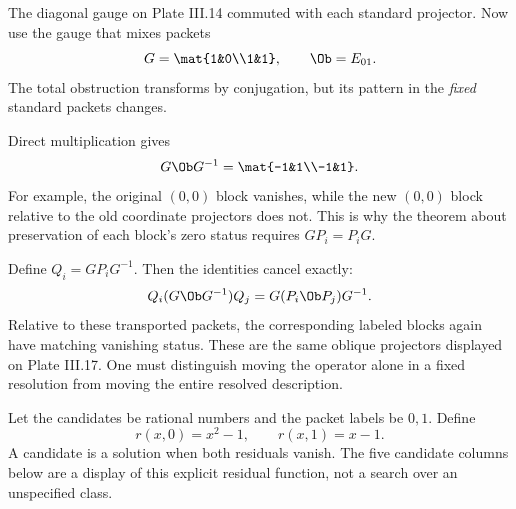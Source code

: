 
The diagonal gauge on Plate III.14 commuted with each standard projector. Now use the gauge that mixes packets
\[
G=\mat{1&0\\1&1},\qquad \Ob=E_{01}.
\]
The total obstruction transforms by conjugation, but its pattern in the \emph{fixed} standard packets changes.


Direct multiplication gives
\[
G\Ob G^{-1}=\mat{-1&1\\-1&1}.
\]
For example, the original $(0,0)$ block vanishes, while the new $(0,0)$ block relative to the old coordinate projectors does not. This is why the theorem about preservation of each block's zero status requires $G P_i=P_iG$.

Define $Q_i=GP_iG^{-1}$. Then the identities cancel exactly:
\[
Q_i(G\Ob G^{-1})Q_j=G(P_i\Ob P_j)G^{-1}.
\]
Relative to these transported packets, the corresponding labeled blocks again have matching vanishing status. These are the same oblique projectors displayed on Plate III.17. One must distinguish moving the operator alone in a fixed resolution from moving the entire resolved description.


Let the candidates be rational numbers and the packet labels be $0,1$. Define
\[
r(x,0)=x^2-1,\qquad r(x,1)=x-1.
\]
A candidate is a solution when both residuals vanish. The five candidate columns below are a display of this explicit residual function, not a search over an unspecified class.


